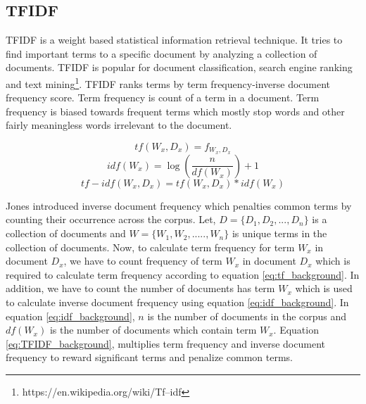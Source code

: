 \subsection{TFIDF}
\label{background:tfidf}
TFIDF is a weight based statistical information retrieval technique. It tries to find important terms to a specific document by analyzing a collection of documents. TFIDF is popular for document classification, search engine ranking and text mining\footnote{https://en.wikipedia.org/wiki/Tf–idf}. TFIDF ranks terms by term frequency-inverse document frequency score. Term frequency is count of a term in a document. Term frequency is biased towards frequent terms which mostly stop words and other fairly meaningless words irrelevant to the document. 

\begin{equation}
    tf (W_x, D_x) = f_{W_x,D_x}
    \label{eq:tf_background}
\end{equation}
\begin{equation}
    idf(W_x) = \log(\frac{n}{df(W_x)})+1
    \label{eq:idf_background}
\end{equation}
\begin{equation}
    tf-idf(W_x, D_x) = tf(W_x,D_x) * idf(W_x)
    \label{eq:TFIDF_background}
\end{equation}


Jones \cite{jones1972statistical} introduced inverse document frequency which penalties common terms by counting their occurrence across the corpus. Let, $D = \{D_1, D_2, ..., D_n\}$ is a collection of documents and $W = \{W_1, W_2, ....., W_n\}$ is unique terms in the collection of documents. Now, to calculate term frequency for term $W_x$ in document $D_x$, we have to count frequency of term $W_x$ in  document $D_x$ which is required to calculate term frequency according to equation \ref{eq:tf_background}. In addition, we have to count the number of documents has term $W_x$ which is used to calculate inverse document frequency using equation \ref{eq:idf_background}. In equation \ref{eq:idf_background}, $n$ is the number of documents in the corpus and $df(W_x)$ is the number of documents which contain term $W_x$. Equation \ref{eq:TFIDF_background}, multiplies term frequency and inverse document frequency to reward significant terms and penalize common terms. 



